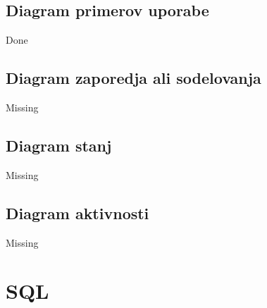 \documentclass[12pt]{article}
\let\stdsection\section
\renewcommand\section{\newpage\stdsection}
\begin{document}
\subsection{Diagram primerov uporabe}

Done

\subsection{Diagram zaporedja ali sodelovanja}

Missing

\subsection{Diagram stanj}

Missing

\subsection{Diagram aktivnosti}

Missing

\section{SQL}
\end{document}
